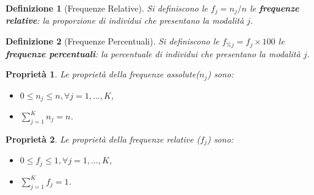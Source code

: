 \documentclass[
  11pt,
]{book}
\providecommand{\tightlist}{%
  \setlength{\itemsep}{0pt}\setlength{\parskip}{0pt}}
\theoremstyle{mytheoremstyle}
\newtheorem{proposition}{Proprietà}[section]
\theoremstyle{mydefstyle}
\newtheorem{definition}{Definizione}[section]
\begin{document}
\begin{info}

\begin{definition}[Frequenze Relative]
Si definiscono le \(f_j=n_j/n\) le \textbf{frequenze relative}: la proporzione di individui che presentano la modalità \(j\).
\end{definition}

\end{info}

\begin{info}

\begin{definition}[Frequenze Percentuali]
Si definiscono le \(f_{\% j}=f_j\times 100\) le \textbf{frequenze percentuali}: la percentuale di individui che presentano la modalità \(j\).
\end{definition}

\end{info}

\begin{info}

\begin{proposition}

Le proprietà della frequenze assolute(\(n_{j}\)) sono:

\begin{itemize}
\tightlist
\item
  \(0\leq n_{j} \leq n, \forall j=1,...,K\),
\item
  \(\sum_{j=1}^{K} n_{j} = n\).
\end{itemize}

\end{proposition}

\end{info}

\begin{info}

\begin{proposition}

Le proprietà della frequenze relative (\(f_{j}\)) sono:

\begin{itemize}
\tightlist
\item
  \(0\leq f_{j} \leq 1, \forall j=1,...,K\),
\item
  \(\sum_{j=1}^{K} f_{j} = 1\).
\end{itemize}

\end{proposition}

\end{info}
\end{document}

